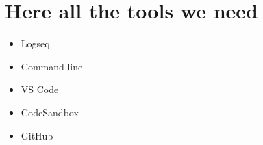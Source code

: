 \section{Here all the tools we need}\label{sec:here-all-the-tools-we-need}

\begin{itemize}
    \item Logseq
    \item Command line
    \item VS Code
    \item CodeSandbox
    \item GitHub
\end{itemize}
